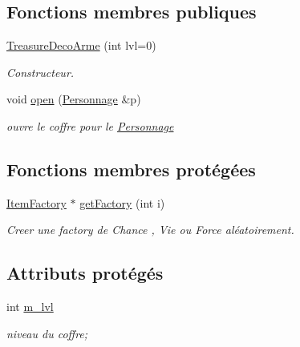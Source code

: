 \subsection*{Fonctions membres publiques}
\begin{DoxyCompactItemize}
\item 
\hyperlink{class_treasure_deco_arme_ac40434b1a1eda8bcfe460f17fc9123fa}{Treasure\-Deco\-Arme} (int lvl=0)
\begin{DoxyCompactList}\small\item\em Constructeur. \end{DoxyCompactList}\item 
void \hyperlink{class_treasure_deco_arme_a31ce1bb2064d0bc9318b8b5f21b22a46}{open} (\hyperlink{class_personnage}{Personnage} \&p)
\begin{DoxyCompactList}\small\item\em ouvre le coffre pour le \hyperlink{class_personnage}{Personnage} \end{DoxyCompactList}\end{DoxyCompactItemize}
\subsection*{Fonctions membres protégées}
\begin{DoxyCompactItemize}
\item 
\hyperlink{class_item_factory}{Item\-Factory} $\ast$ \hyperlink{class_treasure_ab3a8e251ac3ce8524e142e7f93979eb6}{get\-Factory} (int i)
\begin{DoxyCompactList}\small\item\em Creer une factory de Chance , Vie ou Force aléatoirement. \end{DoxyCompactList}\end{DoxyCompactItemize}
\subsection*{Attributs protégés}
\begin{DoxyCompactItemize}
\item 
\hypertarget{class_treasure_a51144d1fb776d1c0612b87d3d8006aa8}{int \hyperlink{class_treasure_a51144d1fb776d1c0612b87d3d8006aa8}{m\-\_\-lvl}}\label{class_treasure_a51144d1fb776d1c0612b87d3d8006aa8}

\begin{DoxyCompactList}\small\item\em niveau du coffre; \end{DoxyCompactList}\end{DoxyCompactItemize}


